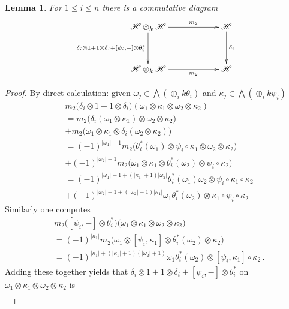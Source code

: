 \documentclass[english,letter paper,12pt,leqno]{article}
\newtheorem{lemma}[theorem]{Lemma}
\theoremstyle{example}
\numberwithin{equation}{section}
\def\be{\begin{equation}}
\def\ee{\end{equation}}
\begin{document}
\begin{lemma}\label{lemma:stratos} For $1 \le i \le n$ there is a commutative diagram
\be
\xymatrix@C+3pc@R+1pc{
\mathscr{H} \otimes_k \mathscr{H} \ar[d]_-{\delta_i \otimes 1 + 1 \otimes \delta_i + [\psi_i,-] \otimes \theta_i^*} \ar[r]^-{m_2} & \mathscr{H} \ar[d]^-{\delta_i}\\
\mathscr{H} \otimes_k \mathscr{H} \ar[r]_-{m_2} & \mathscr{H}
}
\ee
\end{lemma}
\begin{proof}
By direct calculation: given $\omega_j \in \bigwedge( \oplus_i k \theta_i )$ and $\kappa_j \in \bigwedge( \oplus_i k \psi_i )$
\begin{align*}
&m_2\big( \delta_i \otimes 1 + 1 \otimes \delta_i \big)( \omega_1 \otimes \kappa_1 \otimes \omega_2 \otimes \kappa_2 )\\
&= m_2\big( \delta_i( \omega_1 \otimes \kappa_1 ) \otimes \omega_2 \otimes \kappa_2 \big)\\
&+ m_2\big( \omega_1 \otimes \kappa_1 \otimes \delta_i( \omega_2 \otimes \kappa_2 ) \big)\\
&= (-1)^{|\omega_1| + 1}m_2\big( \theta_i^*(\omega_1) \otimes \psi_i \circ \kappa_1 \otimes \omega_2 \otimes \kappa_2 )\\
&+ (-1)^{|\omega_2| + 1}m_2\big( \omega_1 \otimes \kappa_1 \otimes \theta_i^*(\omega_2) \otimes \psi_i \circ \kappa_2 \big)\\
&= (-1)^{|\omega_1|+1+(|\kappa_1|+1)|\omega_2|} \theta_i^*(\omega_1) \omega_2 \otimes \psi_i \circ \kappa_1 \circ \kappa_2\\
&+ (-1)^{|\omega_2|+1+(|\omega_2|+1)|\kappa_1|} \omega_1 \theta_i^*(\omega_2) \otimes \kappa_1 \circ \psi_i \circ \kappa_2
\end{align*}
Similarly one computes
\begin{align*}
&m_2 \big( [\psi_i,-] \otimes \theta_i^* \big)( \omega_1 \otimes \kappa_1 \otimes \omega_2 \otimes \kappa_2 \big)\\
&= (-1)^{|\kappa_1|} m_2 \big( \omega_1 \otimes [\psi_i, \kappa_1] \otimes \theta_i^*(\omega_2) \otimes \kappa_2 \big)\\
&= (-1)^{|\kappa_1|+(|\kappa_1|+1)(|\omega_2|+1)} \omega_1 \theta_i^*(\omega_2) \otimes [\psi_i, \kappa_1] \circ \kappa_2\,.
\end{align*}
Adding these together yields that $\delta_i \otimes 1 + 1 \otimes \delta_i + [\psi_i,-] \otimes \theta_i^*$ on $\omega_1 \otimes \kappa_1 \otimes \omega_2 \otimes \kappa_2$ is
\begin{align*}

\end{align*}
\end{proof}
\end{document}

